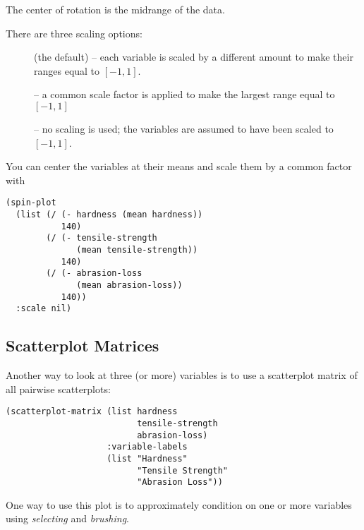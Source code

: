 \begin{slide}{}
The center of rotation is the midrange of the data.

There are three scaling options:
\begin{description}
\item[]
 (the default) -- each variable is scaled by a
different amount to make their ranges equal to $[-1,1]$.
\item[]
 -- a common scale factor is applied to make the largest
range equal to $[-1,1]$
\item[]
 -- no scaling is used; the variables are assumed to have
been scaled to $[-1,1]$.
\end{description}
You can center the variables at their means and scale them by a common
factor with
{\Large
\begin{verbatim}
(spin-plot
  (list (/ (- hardness (mean hardness))
           140)
        (/ (- tensile-strength 
              (mean tensile-strength))
           140)
        (/ (- abrasion-loss
              (mean abrasion-loss))
           140))
  :scale nil)
\end{verbatim}}
\end{slide}

\begin{slide}{}
\subsection{Scatterplot Matrices}
Another way to look at three (or more) variables is
to use a scatterplot matrix of all pairwise scatterplots:
{\Large
\begin{verbatim}
(scatterplot-matrix (list hardness
                          tensile-strength
                          abrasion-loss)
                    :variable-labels
                    (list "Hardness"
                          "Tensile Strength"
                          "Abrasion Loss"))
\end{verbatim}}
One way to use this plot is to approximately condition on one or more
variables using {\em selecting}\/ and {\em brushing}.
\end{slide}

